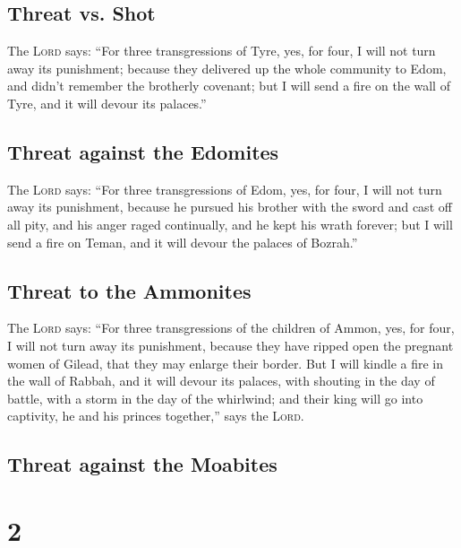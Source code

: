 \hypertarget{threat-vs.-shot}{%
\subsection{Threat vs. Shot}\label{threat-vs.-shot}}

 The \textsc{Lord} says: ``For three transgressions of
Tyre, yes, for four, I will not turn away its punishment; because they
delivered up the whole community to Edom, and didn't remember the
brotherly covenant;  but I will send a fire on the wall
of Tyre, and it will devour its palaces.''

\hypertarget{threat-against-the-edomites}{%
\subsection{Threat against the
Edomites}\label{threat-against-the-edomites}}

 The \textsc{Lord} says: ``For three transgressions of
Edom, yes, for four, I will not turn away its punishment, because he
pursued his brother with the sword and cast off all pity, and his anger
raged continually, and he kept his wrath forever;  but I
will send a fire on Teman, and it will devour the palaces of Bozrah.''

\hypertarget{threat-to-the-ammonites}{%
\subsection{Threat to the Ammonites}\label{threat-to-the-ammonites}}

 The \textsc{Lord} says: ``For three transgressions of
the children of Ammon, yes, for four, I will not turn away its
punishment, because they have ripped open the pregnant women of Gilead,
that they may enlarge their border.  But I will kindle a
fire in the wall of Rabbah, and it will devour its palaces, with
shouting in the day of battle, with a storm in the day of the whirlwind;
 and their king will go into captivity, he and his
princes together,'' says the \textsc{Lord}.

\hypertarget{threat-against-the-moabites}{%
\subsection{Threat against the
Moabites}\label{threat-against-the-moabites}}

\hypertarget{section-1}{%
\section{2}\label{section-1}}

